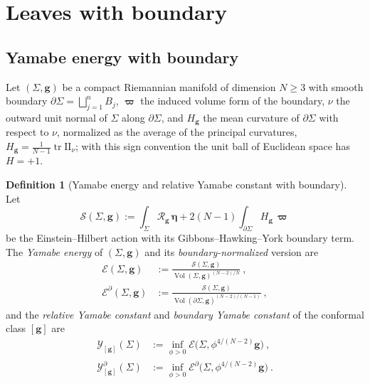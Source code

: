 \documentclass[aps,prd,reprint,amsmath,amssymb,nofootinbib,longbibliography]{revtex4-2}
\DeclareMathOperator{\Vol}{Vol}
\DeclareMathOperator{\tr}{tr}
\newcommand{\g}{\mathbf{g}}                 %
\newcommand{\Rs}{\mathcal{R}}               %
\newcommand{\vol}{\boldsymbol{\eta}}        %
\newcommand{\bvol}{\boldsymbol{\varpi}}     %
\newcommand{\EH}{\mathcal{E}}               %
\newcommand{\EHB}{\mathcal{E}^{\partial}}   %
\newcommand{\Y}{\mathcal{Y}}                %
\newcommand{\YB}{\mathcal{Y}^{\partial}}    %
\theoremstyle{plain}
\theoremstyle{definition}
\newtheorem{definition}[theorem]{Definition}
\theoremstyle{remark}
\begin{document}
\section{Leaves with boundary}
\label{sec:boundary}

\subsection{Yamabe energy with boundary}

Let $(\Sigma,\g)$ be a compact Riemannian manifold of dimension $N\ge3$ with smooth boundary $\partial\Sigma=\bigsqcup_{j=1}^n B_j$, $\bvol$ the induced volume form of the boundary, $\nu$ the outward unit normal of $\Sigma$ along $\partial\Sigma$, and $H_\g$ the mean curvature of $\partial\Sigma$ with respect to $\nu$, normalized as the average of the principal curvatures, $H_\g=\frac{1}{N-1}\tr\mathrm{II}_\nu$; with this sign convention the unit ball of Euclidean space has $H=+1$.

\begin{definition}[Yamabe energy and relative Yamabe constant with boundary]
\label{def:yamabe-bdry}
Let
\begin{equation}
\label{eq:EH-action}
\mathcal{S}(\Sigma,\g):=\int_{\Sigma}\Rs_\g\,\vol+2(N-1)\int_{\partial \Sigma}H_\g\,\bvol
\end{equation}
be the Einstein--Hilbert action with its Gibbons--Hawking--York boundary term. The \emph{Yamabe energy} of $(\Sigma,\g)$ and its \emph{boundary-normalized} version are
\begin{align}
\label{eq:yamabe-energy-bdry}
\EH(\Sigma,\g) &:= \frac{\mathcal{S}(\Sigma,\g)}{\Vol(\Sigma,\g)^{(N-2)/N}}\ ,\\
\label{eq:yamabe-energy-bdry-norm}
\EHB(\Sigma,\g) &:= \frac{\mathcal{S}(\Sigma,\g)}{\Vol(\partial\Sigma,\g)^{(N-2)/(N-1)}}\ ,
\end{align}
and the \emph{relative Yamabe constant} and \emph{boundary Yamabe constant} of the conformal class $[\g]$ are
\begin{align}
\label{eq:relative-yamabe}
\Y_{[\g]}(\Sigma) &:= \inf_{\phi>0}\EH\big(\Sigma,\phi^{4/(N-2)}\g\big)\ ,\\
\label{eq:boundary-yamabe}
\YB_{[\g]}(\Sigma) &:= \inf_{\phi>0}\EHB\big(\Sigma,\phi^{4/(N-2)}\g\big)\ .
\end{align}
\end{definition}
\end{document}
